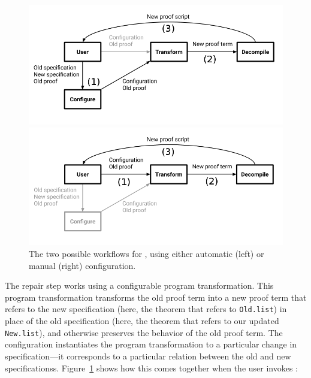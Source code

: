 \begin{figure}
\begin{minipage}{0.49\textwidth}
\includegraphics[width=\linewidth]{workflowa.png}
\end{minipage}
\hfill
\begin{minipage}{0.49\textwidth}
\includegraphics[width=\linewidth]{workflowb.png}
\end{minipage}
\caption{The two possible workflows for \toolname, using either automatic (left) or manual (right) configuration.}
\label{fig:system}
\end{figure}

The repair step works using a configurable program transformation.
This program transformation transforms the old proof term into a new proof term that refers to the new specification
(here, the theorem that refers to \lstinline{Old.list})
in place of the old specification (here, the theorem that refers to our updated \lstinline{New.list}),
and otherwise preserves the behavior of the old proof term.
The configuration instantiates the program transformation to a particular change in specification---it corresponds
to a particular relation between the old and new specificationss.
Figure~\ref{fig:system} shows how this comes together when the user invokes \toolname:

